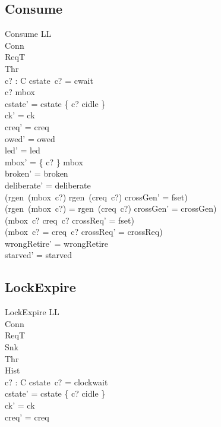 \documentclass[a4paper,10pt,fleqn]{article}
\begin{document}
\subsection{Consume}

\begin{schema}{Consume}
  \Delta LL \\
  \Xi Conn \\
  \Xi ReqT \\
  \Xi Thr \\
  c? : C
\where
  cstate~c? = cwait \\
  c? \in \dom mbox \\
  cstate' = cstate \oplus \{ c? \mapsto cidle \} \\
  ck' = ck \\
  creq' = creq \\
  owed' = owed \\
  led' = led \\
  mbox' = \{ c? \} \ndres mbox \\
  broken' = broken \\
  deliberate' = deliberate \\
  (rgen~(mbox~c?) \neq rgen~(creq~c?) \implies crossGen' = fset) \\
  (rgen~(mbox~c?) = rgen~(creq~c?) \implies crossGen' = crossGen) \\
  (mbox~c? \neq creq~c? \implies crossReq' = fset) \\
  (mbox~c? = creq~c? \implies crossReq' = crossReq) \\
  wrongRetire' = wrongRetire \\
  starved' = starved
\end{schema}

\subsection{LockExpire}

\begin{schema}{LockExpire}
  \Delta LL \\
  \Xi Conn \\
  \Xi ReqT \\
  \Xi Snk \\
  \Xi Thr \\
  \Xi Hist \\
  c? : C
\where
  cstate~c? = clockwait \\
  cstate' = cstate \oplus \{ c? \mapsto cidle \} \\
  ck' = ck \\
  creq' = creq
\end{schema}
\end{document}
